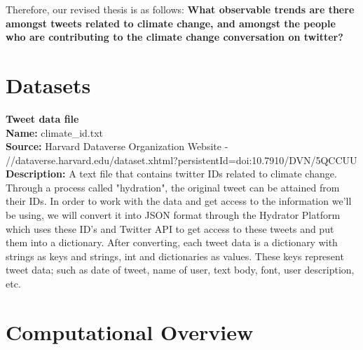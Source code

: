 \documentclass[fontsize=11pt]{article}
\begin{document}
Therefore, our revised thesis is as follows: \textbf{What observable trends are there amongst tweets related to climate change, and amongst the people who are contributing to the climate change conversation on twitter?}

\section*{Datasets} 
    \textbf{Tweet data file} \\
    \textbf{Name:} climate\_id.txt \\
    \textbf{Source:} Harvard Dataverse Organization Website - \\//dataverse.harvard.edu/dataset.xhtml?persistentId=doi:10.7910/DVN/5QCCUU \\
    \textbf{Description:} A text file that contains twitter IDs related to climate change. Through a process called "hydration", the original tweet can be attained from their IDs. In order to work with the data and get access to the information we'll be using, we will convert it into JSON format through the Hydrator Platform which uses these ID's and Twitter API to get access to these tweets and put them into a dictionary. After converting, each tweet data is a dictionary with strings as keys and strings, int and dictionaries as values. These keys represent tweet data; such as date of tweet, name of user, text body, font, user description, etc.

\section*{Computational Overview}
\end{document}
